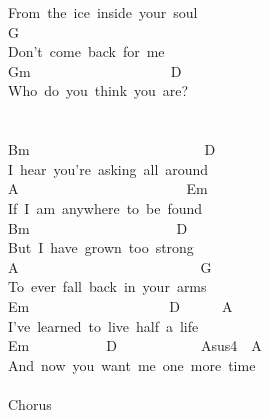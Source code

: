 \documentclass[]{book}
\begin{document}
From~the~ice~inside~your~soul\\
\hspace*{0.333em}\hspace*{0.333em}\hspace*{0.333em}\hspace*{0.333em}\hspace*{0.333em}\hspace*{0.333em}\hspace*{0.333em}\hspace*{0.333em}\hspace*{0.333em}\hspace*{0.333em}\hspace*{0.333em}\hspace*{0.333em}\hspace*{0.333em}\hspace*{0.333em}\hspace*{0.333em}\hspace*{0.333em}\hspace*{0.333em}\hspace*{0.333em}\hspace*{0.333em}\hspace*{0.333em}\hspace*{0.333em}G\\
Don't~come~back~for~me\\
Gm~~~~~~~~~~~~~~~~~~~~D\\
Who~do~you~think~you~are?\\
~\\
~\\
Bm~~~~~~~~~~~~~~~~~~~~~~~~~D\\
I~hear~you're~asking~all~around\\
A~~~~~~~~~~~~~~~~~~~~~~~~Em\\
If~I~am~anywhere~to~be~found\\
Bm~~~~~~~~~~~~~~~~~~~~~D\\
But~I~have~grown~too~strong\\
A~~~~~~~~~~~~~~~~~~~~~~~~~~G\\
To~ever~fall~back~in~your~arms\\
Em~~~~~~~~~~~~~~~~~~~~D~~~~~~A\\
I've~learned~to~live~half~a~life\\
Em~~~~~~~~~~~D~~~~~~~~~~~~Asus4~~A\\
And~now~you~want~me~one~more~time\\
~\\
Chorus\\
~\\
\end{document}
